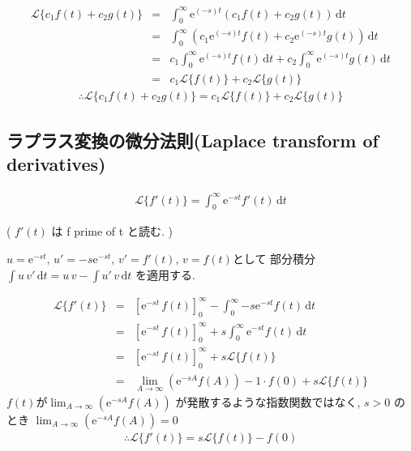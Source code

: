 ﻿\documentclass[a4j]{jarticle}
\begin{document}
\begin{eqnarray*}
\mathcal{L} \{  c_1 f(t) + c_2 g(t) \} &=& \int_0^\infty{ \mathrm{e}^{(-s)t} \left(  c_1 f(t) + c_2 g(t) \right) \, \mathrm{d}t } \\
                                       &=& \int_0^\infty{ \left( c_1 \mathrm{e}^{(-s)t} f(t) + c_2 \mathrm{e}^{(-s)t} g(t) \right) \, \mathrm{d}t } \\
                                       &=& c_1 \int_0^\infty{ \mathrm{e}^{(-s)t} f(t) \, \mathrm{d}t } +  c_2 \int_0^\infty{ \mathrm{e}^{(-s)t} g(t) \, \mathrm{d}t } \\
                                       &=& c_1 \mathcal{L} \{ f(t) \} + c_2 \mathcal{L} \{ g(t) \}
\end{eqnarray*}
\begin{eqnarray*}
\therefore \mathcal{L} \{  c_1 f(t) + c_2 g(t) \} = c_1 \mathcal{L} \{ f(t) \} + c_2 \mathcal{L} \{ g(t) \}
\end{eqnarray*}

\subsection{ラプラス変換の微分法則(Laplace transform of derivatives)}

\begin{eqnarray*}
\mathcal{L} \{  f'(t) \} = \int_0^\infty{ \mathrm{e}^{-st} f'(t) \, \mathrm{d}t }
\end{eqnarray*}

( \( f'(t) \) は f prime of t と読む. )

\( u= \mathrm{e}^{-st} ,\, u' = -s \mathrm{e}^{-st} ,\, v' = f'(t) ,\, v = f(t) \)として
部分積分\( \int{ u\,v' } \, \mathrm{d}t = u\,v - \int{ u'\,v } \, \mathrm{d}t \) を適用する.

\begin{eqnarray*}
\mathcal{L} \{  f'(t) \} &=& \left[ \mathrm{e}^{-st} \, f(t) \right]_0^\infty - \int_0^\infty{ -s \mathrm{e}^{-st} f(t) \, \mathrm{d}t } \\
                         &=& \left[ \mathrm{e}^{-st} \, f(t) \right]_0^\infty + s \int_0^\infty{ \mathrm{e}^{-st} f(t) \, \mathrm{d}t } \\
                         &=& \left[ \mathrm{e}^{-st} \, f(t) \right]_0^\infty + s \mathcal{L} \{  f(t) \} \\
                         &=& \lim_{A \to \infty} \left( \mathrm{e}^{-sA} f(A) \right) - 1 \cdot f(0) + s \mathcal{L} \{  f(t) \}
\end{eqnarray*}
\( f(t) \text{が}  \lim_{A \to \infty} \left( \mathrm{e}^{-sA} f(A) \right) \) が発散するような指数関数ではなく, \( s>0 \) のとき \( \lim_{A \to \infty} \left( \mathrm{e}^{-sA} f(A) \right) = 0 \)
\begin{eqnarray*}
\therefore \mathcal{L} \{  f'(t) \} = s \mathcal{L} \{  f(t) \} - f(0)
\end{eqnarray*}
\end{document}

